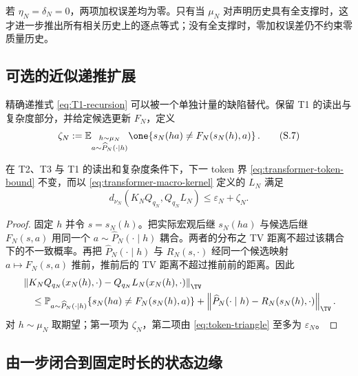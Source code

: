 \begin{remark}[精确情形]
若 $\eta_N=\delta_N=0$，两项加权误差均为零。只有当 $\mu_N$ 对声明历史具有全支撑时，这才进一步推出所有相关历史上的逐点等式；没有全支撑时，零加权误差仍不约束零质量历史。
\end{remark}

\subsection{可选的近似递推扩展}

精确递推式 \eqref{eq:T1-recursion} 可以被一个单独计量的缺陷替代。保留 T1 的读出与复杂度部分，并给定候选更新 $F_N$，定义
\[
 \zeta_N
 :=\mathbb E_{\substack{h\sim\mu_N\\
                         a\sim\widehat P_N(\cdot\mid h)}}
 \one\!\left\{s_N(ha)\ne F_N(s_N(h),a)\right\}.
 \tag{S.7}\label{eq:recursion-defect}
\]

\begin{proposition}[近似递推]
\label{prop:transformer-approx-recursion}
在 T2、T3 与 T1 的读出和复杂度条件下，下一 token 界
\eqref{eq:transformer-token-bound} 不变，而以
\eqref{eq:transformer-macro-kernel} 定义的 $L_N$ 满足
\[
 d_{\nu_N}(K_NQ_{q_N},Q_{q_N}L_N)
 \le\varepsilon_N+\zeta_N.
 \tag{S.8}\label{eq:approx-recursion-bound}
\]
\end{proposition}

\begin{proof}
固定 $h$ 并令 $s=s_N(h)$。把实际宏观后继
$s_N(ha)$ 与候选后继 $F_N(s,a)$ 用同一个
$a\sim\widehat P_N(\cdot\mid h)$ 耦合。两者的分布之 TV 距离不超过该耦合下的不一致概率。再把
$\widehat P_N(\cdot\mid h)$ 与 $R_N(s,\cdot)$ 经同一个候选映射
$a\mapsto F_N(s,a)$ 推前，推前后的 TV 距离不超过推前前的距离。因此
\[
 \begin{aligned}
 &\left\|K_NQ_{q_N}(x_N(h),\cdot)
       -Q_{q_N}L_N(x_N(h),\cdot)\right\|_{\TV}\\
 &\quad\le
 \mathbb P_{a\sim\widehat P_N(\cdot\mid h)}
 \{s_N(ha)\ne F_N(s_N(h),a)\}
 +\left\|\widehat P_N(\cdot\mid h)-R_N(s_N(h),\cdot)\right\|_{\TV}.
 \end{aligned}
\]
对 $h\sim\mu_N$ 取期望；第一项为 $\zeta_N$，第二项由
\eqref{eq:token-triangle} 至多为 $\varepsilon_N$。
\end{proof}

\subsection{由一步闭合到固定时长的状态边缘}

